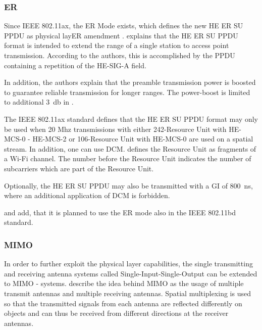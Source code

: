 \subsubsection*{\acf{ER}}
Since IEEE 802.11ax, the \ac{ER} Mode exists, which defines the new \ac{HE} \ac{ER} SU \ac{PPDU} as physical lay\ac{ER} amendment
\cite{noauthor_ieee_2021,afaqui_ieee_2017} .
\textcite{deng_ieee_2017} explains that the \ac{HE} \ac{ER} SU \ac{PPDU} format is intended to extend the range of
a single station to access point transmission.
According to the authors, this is accomplished by the \ac{PPDU} containing a repetition of the HE-SIG-A field.

In addition, the authors explain that the preamble transmission power is boosted
to guarantee reliable transmission for longer ranges.
The power-boost is limited to additional \SI{3}{\decibel}
in \cite{noauthor_ieee_2021,jacob_system-level_2020}.

The IEEE 802.11ax \cite{noauthor_ieee_2021} standard defines that the \ac{HE} \ac{ER} SU \ac{PPDU} format may only be used
when 20 Mhz transmissions with either 242-Resource Unit with HE-MCS-0 - HE-MCS-2 or 106-Resource Unit with HE-MCS-0 are used on a spatial stream.
In addition, one can use \ac{DCM}.
\textcite{sauter_wireless_2022} defines the Resource Unit as fragments of a Wi-Fi channel. The number before the Resource Unit
indicates the number of subcarriers which are part of the Resource Unit.

Optionally, the \ac{HE} \ac{ER} SU \ac{PPDU} may also be transmitted with a \ac{GI} of \SI{800}{\nano\second},
where an additional application of \ac{DCM} is forbidden.

\textcite{jacob_system-level_2020} and \textcite{triwinarko_phy_2021} add, that it is planned to use
the \ac{ER} mode also in the IEEE 802.11bd standard.

\subsubsection*{\acf{MIMO}}
In order to further exploit the physical layer capabilities, the single transmitting and receiving antenna systems called Single-Input-Single-Output can be extended to \ac{MIMO} - systems.
\textcite{sauter_wireless_2022} describe the idea behind \ac{MIMO} as the usage of multiple transmit antennas and multiple receiving antennas. Spatial multiplexing is used so that the transmitted signals
from each antenna are reflected differently on objects and can thus be received from different directions at the receiver antennas.

